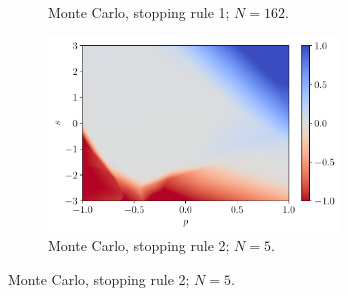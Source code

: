 \documentclass[a4paper, 12pt]{article}
\begin{document}
\begin{figure}[H]
\begin{subfigure}{0.49\textwidth}
            \caption{Monte Carlo, stopping rule 1; $N = 162$.}
        \end{subfigure}
        \hfill
        \begin{subfigure}{0.49\textwidth}
            \centering
            \includegraphics[width=0.85\textwidth]{resources/pdf/4_montecarlo_2_MLP_q_-4.pdf}
            \caption{Monte Carlo, stopping rule 2; $N = 5$.}
        \end{subfigure}
        \label{fig:qn.mlp.minus.4}
    \end{figure}
    
\end{document}
